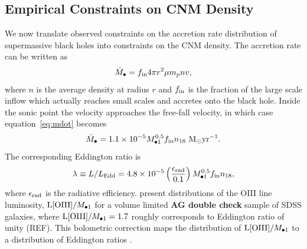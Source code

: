 \documentclass[usenatbib,fleqn]{mnras}
\newcommand{\Mbh}[1][]{M_{\bullet1}}
\newcommand{\Msun}{{\rm M_\odot}}
\begin{document}

\subsection{Empirical Constraints on CNM Density}
\label{sec:empirical}

We now translate observed constraints on the accretion
rate distribution of supermassive black holes into constraints on the
CNM density.  The accretion rate can be written as
\begin{equation}
\dot{M}_{\bullet} = f_{\rm in} 4 \pi r^2 \mu m_p n v,
\label{eq:mdot}
\end{equation}
where $n$ is the average density at radius $r$ and $f_{\rm in}$ is the
fraction of the large scale inflow which actually reaches small scales
and accretes onto the black hole.  Inside the sonic point the velocity
approaches the free-fall velocity, in which case
equation~\eqref{eq:mdot} becomes
\begin{equation}
  \dot{M}_{\bullet} = 1.1\times 10^{-5} \Mbh[,7]^{0.5} f_{\rm in}
  n_{18} \,\,\Msun {\rm yr}^{-1}.
\label{eq:mdot2}
\end{equation}
%
The corresponding Eddington ratio is
\begin{equation}
  \lambda\equiv L/L_{\rm Edd} = 4.8 \times 10^{-5}
  \left(\frac{\epsilon_{\rm rad}}{0.1}\right) \Mbh[,7]^{0.5} f_{\rm in}
  n_{18},
\label{eq:n18Edd}
\end{equation}
%
where $\epsilon_{\rm rad}$ is the radiative
efficiency. \citet{Kauffmann&Heckman2009} present distributions of the
OIII line luminosity, ${\rm L[OIII]}/\Mbh$ for a volume limited {\bf
  AG double check} sample of SDSS galaxies, where ${\rm
  L[OIII]}/\Mbh=1.7$ roughly corresponds to Eddington ratio of unity
(REF).  This bolometric correction maps the distribution of ${\rm
  L[OIII]}/\Mbh$ to a distribution of Eddington ratios
\citep{Kauffmann&Heckman2009}.
\end{document}

